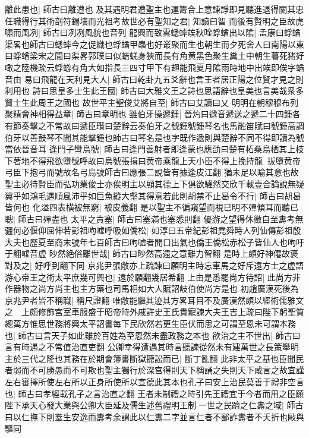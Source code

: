 離此患也|{
	師古曰離遭也}
及其遇明君遭聖主也運籌合上意諫諍即見聽進退得關其忠任職得行其術剖符錫壤而光祖考故世必有聖知之君|{
	知讀曰智}
而後有賢明之臣故虎嘯而風冽|{
	師古曰冽冽風貌也音列}
龍興而致雲蟋蟀竢秋唫蜉蝤出以隂|{
	孟康曰蜉蝤渠畧也師古曰蟋蟀今之促織也蜉蝤甲蟲也好叢聚而生也朝生而夕死舍人曰南陽以東曰蜉蝤梁宋之間曰渠畧郭璞曰似蛣蜣身狹而長有角黄黑色聚生糞土中朝生暮死猪好噉之陸機疏云蜉蝣有角大如指長三四寸甲下有翅能飛夏月隂雨時地中出竢即俟字蝤音由}
易曰飛龍在天利見大人|{
	師古曰乾卦九五爻辭也言王者居正陽之位賢才見之則利用也}
詩曰思皇多士生此王國|{
	師古曰大雅文王之詩也思語辭也皇美也言美哉衆多賢士生此周王之國也}
故世平主聖俊艾將自至|{
	師古曰艾讀曰乂}
明明在朝穆穆布列聚精會神相得益章|{
	師古曰章明也}
雖伯牙操遞鍾|{
	晉灼曰遞音遞送之遞二十四鍾各有節奏擊之不常故曰遞臣瓚曰楚辭云奏伯牙之號鍾號鍾琴名也馬融笛賦曰號鍾高調伯牙以善鼓琴不聞其能擊鍾也師古曰琴名是也字既作遞則與楚辭不同不得即讀為號當依晉音耳}
逢門子彎烏號|{
	師古曰逢門善射者即逢蒙也應劭曰楚有柘桑烏栖其上枝下著地不得飛欲墮號呼故曰烏號張揖曰黄帝乘龍上天小臣不得上挽持龍拔墮黄帝弓臣下抱弓而號故名弓烏號師古曰應張二說皆有據逢皮江翻}
猶未足以喻其意也故聖主必待賢臣而弘功業俊士亦俟明主以顯其德上下俱欲驩然交欣千載壹合論說無疑翼乎如鴻毛遇順風沛乎如巨魚縱大壑其得意若此則胡禁不止曷令不行|{
	師古曰胡曷皆何也}
化溢四表横被無窮|{
	被皮義翻}
是以聖主不徧窺望而視已明不殫傾耳而聽已聰|{
	師古曰殫盡也}
太平之責塞|{
	師古曰塞滿也塞悉則翻}
優游之望得休徵自至夀考無疆何必偃仰屈伸若彭祖呴嘘呼吸如僑松|{
	如淳曰五帝紀彭祖堯舜時人列仙傳彭祖殷大夫也歷夏至商末號年七百師古曰呴嘘者開口出氣也僑王僑松赤松子皆仙人也呴吁于翻嘘音虚}
眇然絶俗離世哉|{
	師古曰眇然高遠之意離力智翻}
是時上頗好神僊故褒對及之|{
	好呼到翻下同}
京兆尹張敞亦上疏諫曰願明主時忘車馬之好斥遠方士之虚語游心帝王之術太平庶幾可興也|{
	遠於願翻幾居希翻}
上由是悉罷尚方待詔|{
	此尚方非作器物之尚方尚主也主方藥也司馬相如大人賦詔岐伯使尚方是也}
初趙廣漢死後為京兆尹者皆不稱職|{
	稱尺證翻}
唯敞能繼其迹其方畧耳目不及廣漢然頗以經術儒雅文之　上頗修飾宫室車服盛于昭帝時外戚許史王氏貴寵諫大夫王吉上疏曰陛下躬聖質總萬方惟思世務將興太平詔書每下民欣然若更生臣伏而思之可謂至恩未可謂本務也|{
	師古曰言天子如此雖於百姓為至恩然未盡政務之本也}
欲治之主不世出|{
	師古曰言有時遇之不常值治直吏翻}
公卿幸得遭遇其時言聽諫從然未有建萬世之長策舉明主於三代之隆也其務在於期會簿書斷獄聽訟而已|{
	斷丁亂翻}
此非太平之基也臣聞民者弱而不可勝愚而不可欺也聖主獨行於深宫得則天下稱誦之失則天下咸言之故宜謹左右審擇所使左右所以正身所使所以宣德此其本也孔子曰安上治民莫善于禮非空言也|{
	師古曰孝經載孔子之言治直之翻}
王者未制禮之時引先王禮宜于今者而用之臣願陛下承天心發大業與公卿大臣延及儒生述舊禮明王制一世之民躋之仁夀之域|{
	師古曰以仁撫下則羣生安逸而夀考余謂此以仁夀二字並言仁者不鄙詐夀者不夭折也敺與驅同}

